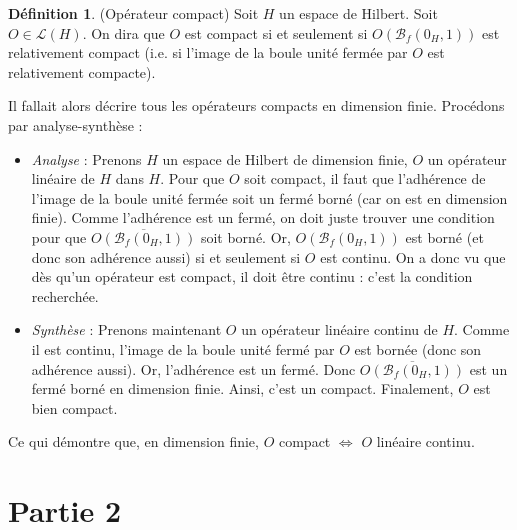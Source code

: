 \documentclass[a4paper,11pt]{article}
\theoremstyle{plain}
\theoremstyle{definition}
\newtheorem*{defi}{Définition}
\begin{document}
\begin{defi} (Opérateur compact)
Soit $H$ un espace de Hilbert.
Soit $O \in \mathcal{L}(H)$.
On dira que $O$ est compact si et seulement si $O\left(\mathcal{B}_f(0_H,1)\right)$ est relativement compact (i.e. si l'image de la boule unité fermée par $O$ est relativement compacte).
\end{defi}

Il fallait alors décrire tous les opérateurs compacts en dimension finie.
Procédons par analyse-synthèse :
\begin{itemize}
\item \emph{Analyse} : Prenons $H$ un espace de Hilbert de dimension finie, $O$ un opérateur linéaire de $H$ dans $H$.
Pour que $O$ soit compact, il faut que l'adhérence de l'image de la boule unité fermée soit un fermé borné (car on est en dimension finie).
Comme l'adhérence est un fermé, on doit juste trouver une condition pour que $\overline{O\left(\mathcal{B}_f(0_H,1)\right)}$ soit borné.
Or, $O\left(\mathcal{B}_f(0_H,1)\right)$ est borné (et donc son adhérence aussi) si et seulement si $O$ est continu.
On a donc vu que dès qu'un opérateur est compact, il doit être continu : c'est la condition recherchée.
\item \emph{Synthèse} : Prenons maintenant $O$ un opérateur linéaire continu de $H$. Comme il est continu, l'image de la boule unité fermé par $O$ est bornée (donc son adhérence aussi). Or, l'adhérence est un fermé. Donc $\overline{O\left(\mathcal{B}_f(0_H,1)\right)}$ est un fermé borné en dimension finie. Ainsi, c'est un compact. Finalement, $O$ est bien compact.
\end{itemize}
Ce qui démontre que, en dimension finie, $O$ compact $\Leftrightarrow$ $O$ linéaire continu.

\section*{Partie 2}
\end{document}
